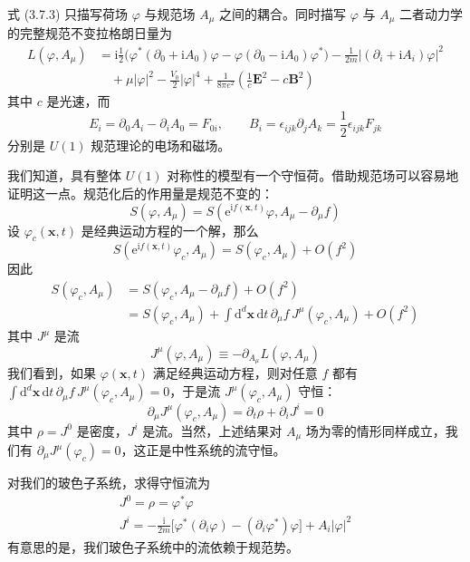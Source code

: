 式 (3.7.3) 只描写荷场 $\varphi$ 与规范场 $A_\mu$ 之间的耦合。同时描写 $\varphi$ 与 $A_\mu$ 二者动力学的完整规范不变拉格朗日量为
\begin{align*}
L(\varphi,A_\mu)&=\mathrm{i}\frac{1}{2}\big(\varphi^*(\partial_0+\mathrm{i}A_0)\varphi-\varphi(\partial_0-\mathrm{i}A_0)\varphi^*\big)-\frac{1}{2m}\big|(\partial_i+\mathrm{i}A_i)\varphi\big|^2\\
&\quad+\mu|\varphi|^2-\frac{V_0}{2}|\varphi|^4+\frac{1}{8\pi e^2}\left(\frac{1}{c}\pmb{E}^2-c\pmb{B}^2\right) \tag{3.7.5}
\end{align*}
其中 $c$ 是光速，而
\begin{equation*}
E_i=\partial_0A_i-\partial_iA_0=F_{0i},\qquad B_i=\epsilon_{ijk}\partial_jA_k=\frac{1}{2}\epsilon_{ijk}F_{jk}
\end{equation*}
分别是 $U(1)$ 规范理论的电场和磁场。

我们知道，具有整体 $U(1)$ 对称性的模型有一个守恒荷。借助规范场可以容易地证明这一点。规范化后的作用量是规范不变的：
\begin{equation*}
S(\varphi,A_\mu)=S(\mathrm{e}^{\mathrm{i}f(\pmb{x},t)}\varphi,A_\mu-\partial_\mu f)
\end{equation*}
设 $\varphi_c(\pmb{x},t)$ 是经典运动方程的一个解，那么
\begin{equation*}
S(\mathrm{e}^{\mathrm{i}f(\pmb{x},t)}\varphi_c,A_\mu)=S(\varphi_c,A_\mu)+O(f^2)
\end{equation*}
因此
\begin{align*}
S(\varphi_c,A_\mu)&=S(\varphi_c,A_\mu-\partial_\mu f)+O(f^2)\\
&=S(\varphi_c,A_\mu)+\int\mathrm{d}^d\pmb{x}\,\mathrm{d}t\,\partial_\mu f\,J^\mu(\varphi_c,A_\mu)+O(f^2)
\end{align*}
其中 $J^\mu$ 是流
\begin{equation*}
J^\mu(\varphi,A_\mu)\equiv-\partial_{A_\mu}L(\varphi,A_\mu)
\end{equation*}
我们看到，如果 $\varphi(\pmb{x},t)$ 满足经典运动方程，则对任意 $f$ 都有 $\int\mathrm{d}^d\pmb{x}\,\mathrm{d}t\,\partial_\mu f\,J^\mu(\varphi_c,A_\mu)=0$，于是流 $J^\mu(\varphi_c,A_\mu)$ 守恒：
\begin{equation*}
\partial_\mu J^\mu(\varphi_c,A_\mu)=\partial_t\rho+\partial_iJ^i=0
\end{equation*}
其中 $\rho=J^0$ 是密度，$J^i$ 是流。当然，上述结果对 $A_\mu$ 场为零的情形同样成立，我们有 $\partial_\mu J^\mu(\varphi_c)=0$，这正是中性系统的流守恒。

对我们的玻色子系统，求得守恒流为
\begin{gather*}
J^0=\rho=\varphi^*\varphi\\
J^i=-\frac{\mathrm{i}}{2m}\big[\varphi^*(\partial_i\varphi)-(\partial_i\varphi^*)\varphi\big]+A_i|\varphi|^2
\end{gather*}
有意思的是，我们玻色子系统中的流依赖于规范势。

